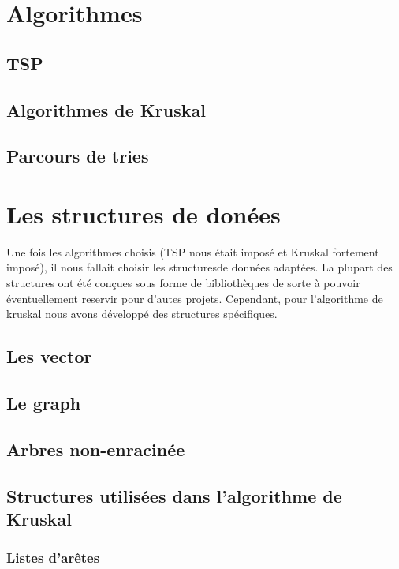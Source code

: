 \documentclass[a4paper]{article}
\begin{document}
\bigskip

\section{Algorithmes}

\subsection{TSP}

\subsection{Algorithmes de Kruskal}

\subsection{Parcours de tries}

\section{Les structures de donées}

Une fois les algorithmes choisis (TSP nous était imposé et Kruskal fortement imposé), il nous fallait choisir les structuresde données adaptées. La plupart des structures ont été conçues sous forme de bibliothèques de sorte à pouvoir éventuellement reservir pour d'autes projets. Cependant, pour l'algorithme de kruskal nous avons développé des structures spécifiques.

\subsection{Les vector}

\subsection{Le graph}

\subsection{Arbres non-enracinée}

\subsection{Structures utilisées dans l'algorithme de Kruskal}

\subsubsection{Listes d'arêtes}
\end{document}
